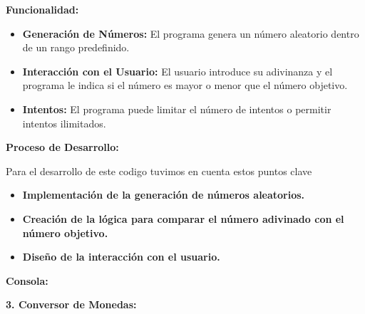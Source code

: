 \documentclass[a4paper]{article}
\begin{document}
\begin{center}
\end{center}

{
\textbf{Funcionalidad:}}


\bigskip

\begin{itemize}[resume*=listWWNumiii]
\item {
\textbf{Generación de Números:} El programa genera un número aleatorio dentro de un rango predefinido.}
\item {
\textbf{Interacción con el Usuario:} El usuario introduce su adivinanza y el programa le indica si el número es mayor o
menor que el número objetivo.}
\item {
\textbf{Intentos:} El programa puede limitar el número de intentos o permitir intentos ilimitados.}
\end{itemize}
{
\textbf{Proceso de Desarrollo:}}

{
Para el desarrollo de este codigo tuvimos en cuenta estos puntos clave}

\begin{itemize}[resume*=listWWNumiii]
\item {
\textbf{Implementación de la generación de números aleatorios.}}
\item {
\textbf{Creación de la lógica para comparar el número adivinado con el número objetivo.}}
\item {
\textbf{Diseño de la interacción con el usuario.}}
\end{itemize}
{
\textbf{Consola:}}

\begin{center}
\end{center}
\begin{center}
\end{center}
\clearpage
{
\textbf{3. Conversor de Monedas:}}
\end{document}
